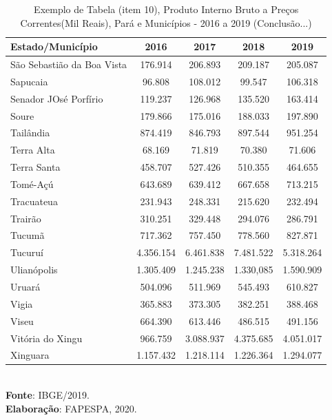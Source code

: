 \newpage
\begin{table}[H]
    \centering
    {
    \caption{Exemplo de Tabela (item 10), Produto Interno Bruto a Preços Correntes(Mil Reais), Pará e Municípios - 2016 a 2019 (Conclusão...)}  
    \label{item 10 regras5}
\begin{tabular}{l|c|c|c|c}
  \hline\hline
  Estado/Município            &    2016    &  2017   &  2018       &  2019    \\
  \hline\hline
   São Sebastião da Boa Vista &  176.914   &  206.893  & 209.187   & 205.087  \\
   Sapucaia                   &  96.808    & 108.012   & 99.547    & 106.318  \\
   Senador JOsé Porfírio      &  119.237   & 126.968   & 135.520   & 163.414  \\ 
   Soure                      &  179.866   & 175.016   & 188.033   & 197.890  \\
   Tailândia                  & 874.419    & 846.793   & 897.544   & 951.254  \\
   Terra Alta                 &  68.169    & 71.819    & 70.380    & 71.606  \\
   Terra Santa                &  458.707   & 527.426   & 510.355   & 464.655 \\
   Tomé-Açú                   &  643.689   & 639.412   & 667.658   & 713.215 \\
   Tracuateua                 &  231.943   & 248.331   & 215.620   & 232.494 \\
   Trairão                    &  310.251   & 329.448   & 294.076   & 286.791 \\
   Tucumã                     &  717.362   & 757.450     & 778.560   & 827.871 \\
   Tucuruí                    &  4.356.154 & 6.461.838   & 7.481.522 & 5.318.264 \\
   Ulianópolis                &  1.305.409 & 1.245.238   & 1.330,085 & 1.590.909 \\
   Uruará                     &  504.096   & 511.969     & 545.493   & 610.827  \\
   Vigia                      &  365.883   & 373.305     & 382.251   & 388.468 \\
   Viseu                      &  664.390   & 613.446     & 486.515   &  491.156 \\
   Vitória do Xingu           & 966.759    &  3.088.937  & 4.375.685 &  4.051.017  \\
   Xinguara                   & 1.157.432  & 1.218.114   & 1.226.364 & 1.294.077 \\
   \hline\hline
\end{tabular}}
\\
\hspace{-7.5cm}
\textbf{Fonte}: IBGE/2019. \\
\hspace{-7.5cm}
\textbf{Elaboração}: FAPESPA, 2020.
\end{table}













